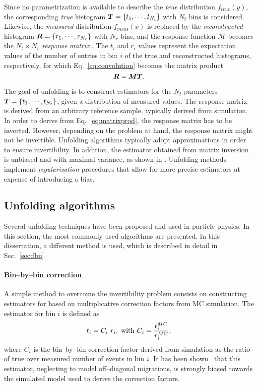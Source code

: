 Since no parametrization is available to describe the {\it true}
distribution $f_{true}(y)$, the corresponding {\it true} histogram
$\boldsymbol{T}{}=\{t_1,\cdots{},t_{N_t}\}$ with $N_t$ bins is
considered. Likewise, the {\it measured} distribution $f_{meas}(x)$ is
replaced by the {\it reconstructed} histogram $\boldsymbol{R}{}=\{r_1,\cdots{},r_{N_r}\}$ with
$N_r$ bins, and the response function $\mathcal{M}$ becomes the $N_t\times N_r$ {\it
  response matrix} \TrasfMatrix{}.
The $t_i$ and $r_i$ values represent the expectation values of the number of
entries in bin $i$ of the true and reconstructed histograms,
respectively, for which Eq.~\ref{eq:convolution} becomes the matrix product
\begin{equation}
\label{eq:matrixprod}
\boldsymbol{R}{} = \boldsymbol{M}{}\boldsymbol{T}{}.
\end{equation}

The goal of unfolding is to construct estimators for the $N_t$
parameters $\boldsymbol{T}{}=\{t_1,\cdots{},t_{N_t}\}$, given a distribution
\Reco{} of measured values. The response matrix \TrasfMatrix{} is derived from
an arbitrary reference sample, typically derived from simulation.
In order to derive \Truth{} from Eq.~\ref{eq:matrixprod}, the response
matrix \TrasfMatrix{} has to be inverted. However, depending on the
problem at hand, the response matrix might not be
invertible. Unfolding algorithms typically adopt approximations in
order to ensure invertibility. In addition, the estimator obtained from
matrix inversion is unbiased and with maximal variance, as shown in
\cite{Cowan:2002in}.
Unfolding methods implement {\it regularization} procedures
that allow for more precise estimators at expense of introducing a bias.

\subsection{Unfolding algorithms}

Several unfolding techniques have been proposed and used in particle
physics. In this section, the most commonly used algorithms are
presented. In this dissertation, a different method is used, which is
described in detail in Sec.~\ref{sec:fbu}.

\paragraph{Bin--by--bin correction}
A simple method to overcome the invertibility problem consists on
constructing estimators for \Truth{} based on multiplicative
correction factors from MC simulation. The estimator for bin $i$ is
defined as
\begin{equation}
t_i = C_i~r_i,~{\rm with}~C_i=\frac{t_i^{MC}}{r_i^{MC}},
\end{equation}
where $C_i$ is the bin--by--bin correction factor derived from
simulation as the ratio of true over measured number of events in bin $i$.
It has been shown~\cite{Cowan:2002in} that this estimator, neglecting
to model off--diagonal migrations, is strongly biased towards the
simulated model used to derive the correction factors. 
